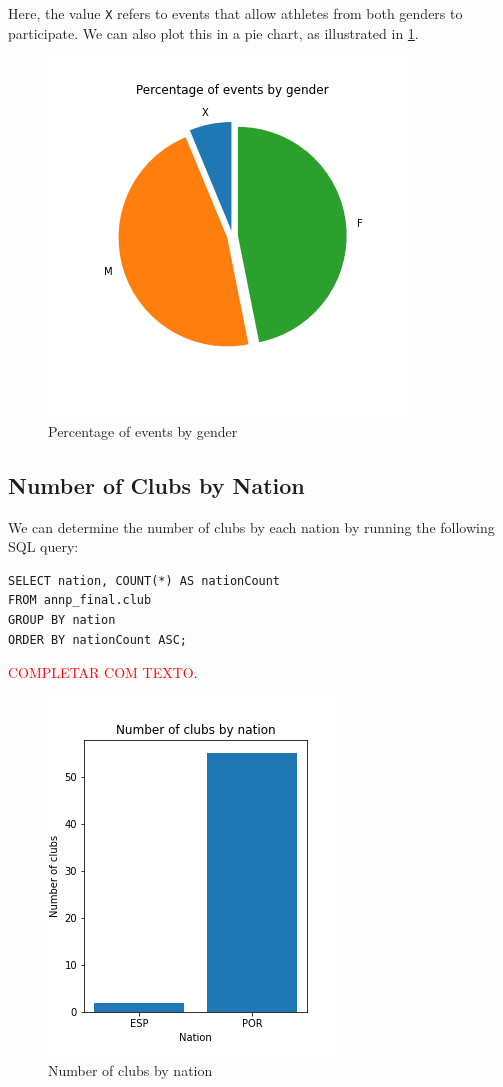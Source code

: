 Here, the value \texttt{X} refers to events that allow athletes from both genders to participate.
We can also plot this in a pie chart, as illustrated in \cref{fig:eventsbygender-pie}.

\begin{figure}[H]
    \centering
    \includegraphics[width=.45\textwidth]{img/eventsbygender-pie}
    \caption{Percentage of events by gender}
    \label{fig:eventsbygender-pie}
\end{figure}

\subsection{Number of Clubs by Nation}\label{subsec:number-of-clubs-by-nation}

We can determine the number of clubs by each nation by running the following SQL query:

\begin{verbatim}
SELECT nation, COUNT(*) AS nationCount
FROM annp_final.club
GROUP BY nation
ORDER BY nationCount ASC;
\end{verbatim}

\textcolor{red}{COMPLETAR COM TEXTO}.

\begin{figure}[H]
    \centering
    \includegraphics[width=.35\textwidth]{img/clubsbynation}
    \caption{Number of clubs by nation}
    \label{fig:clubs-by-nation}
\end{figure}


